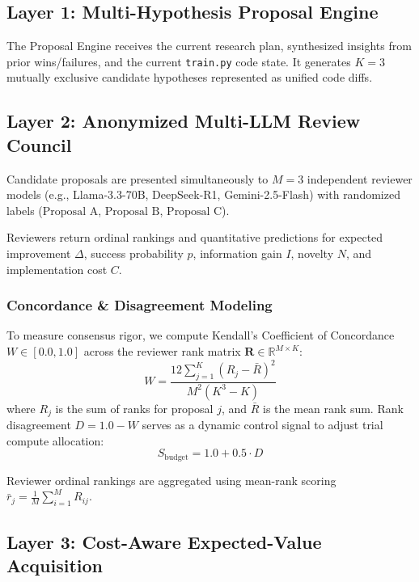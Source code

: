 \documentclass[10pt,twocolumn,3p,times]{article}
\begin{document}
\subsection{Layer 1: Multi-Hypothesis Proposal Engine}

The Proposal Engine receives the current research plan, synthesized insights from prior wins/failures, and the current \texttt{train.py} code state. It generates $K=3$ mutually exclusive candidate hypotheses represented as unified code diffs.

\subsection{Layer 2: Anonymized Multi-LLM Review Council}

Candidate proposals are presented simultaneously to $M=3$ independent reviewer models (e.g., Llama-3.3-70B, DeepSeek-R1, Gemini-2.5-Flash) with randomized labels ($\text{Proposal A}$, $\text{Proposal B}$, $\text{Proposal C}$).

Reviewers return ordinal rankings and quantitative predictions for expected improvement $\Delta$, success probability $p$, information gain $I$, novelty $N$, and implementation cost $C$.

\subsubsection{Concordance \& Disagreement Modeling}

To measure consensus rigor, we compute Kendall's Coefficient of Concordance $W \in [0.0, 1.0]$ across the reviewer rank matrix $\mathbf{R} \in \mathbb{R}^{M \times K}$:
\begin{equation}
    W = \frac{12 \sum_{j=1}^{K} \left( R_j - \bar{R} \right)^2}{M^2 (K^3 - K)}
    \label{eq:kendalls_w}
\end{equation}
where $R_j$ is the sum of ranks for proposal $j$, and $\bar{R}$ is the mean rank sum. Rank disagreement $D = 1.0 - W$ serves as a dynamic control signal to adjust trial compute allocation:
\begin{equation}
    S_{\text{budget}} = 1.0 + 0.5 \cdot D
    \label{eq:budget_scalar}
\end{equation}

Reviewer ordinal rankings are aggregated using mean-rank scoring $\bar{r}_j = \frac{1}{M} \sum_{i=1}^M R_{ij}$.

\subsection{Layer 3: Cost-Aware Expected-Value Acquisition}
\end{document}
